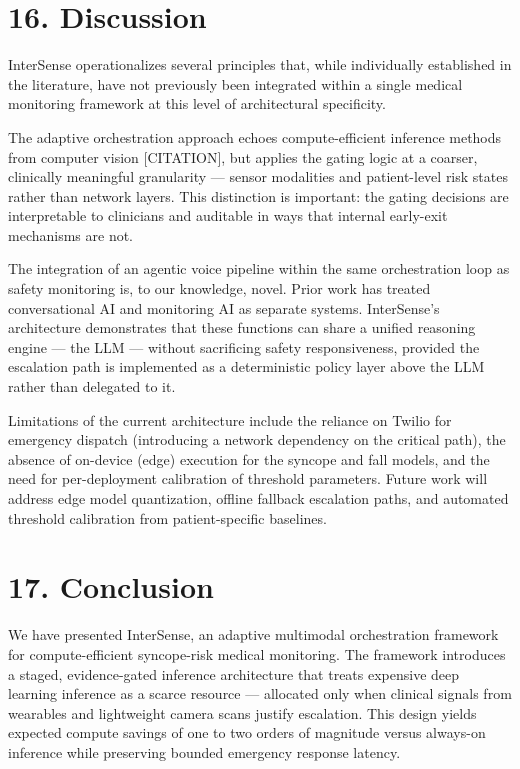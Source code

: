\documentclass[11pt,a4paper]{article}
\begin{document}
\section{16. Discussion}
InterSense operationalizes several principles that, while individually established in the literature, have not previously been integrated within a single medical monitoring framework at this level of architectural specificity.

The adaptive orchestration approach echoes compute-efficient inference methods from computer vision [CITATION], but applies the gating logic at a coarser, clinically meaningful granularity — sensor modalities and patient-level risk states rather than network layers. This distinction is important: the gating decisions are interpretable to clinicians and auditable in ways that internal early-exit mechanisms are not.

The integration of an agentic voice pipeline within the same orchestration loop as safety monitoring is, to our knowledge, novel. Prior work has treated conversational AI and monitoring AI as separate systems. InterSense's architecture demonstrates that these functions can share a unified reasoning engine — the LLM — without sacrificing safety responsiveness, provided the escalation path is implemented as a deterministic policy layer above the LLM rather than delegated to it.

Limitations of the current architecture include the reliance on Twilio for emergency dispatch (introducing a network dependency on the critical path), the absence of on-device (edge) execution for the syncope and fall models, and the need for per-deployment calibration of threshold parameters. Future work will address edge model quantization, offline fallback escalation paths, and automated threshold calibration from patient-specific baselines.

\section{17. Conclusion}
We have presented InterSense, an adaptive multimodal orchestration framework for compute-efficient syncope-risk medical monitoring. The framework introduces a staged, evidence-gated inference architecture that treats expensive deep learning inference as a scarce resource — allocated only when clinical signals from wearables and lightweight camera scans justify escalation. This design yields expected compute savings of one to two orders of magnitude versus always-on inference while preserving bounded emergency response latency.
\end{document}
